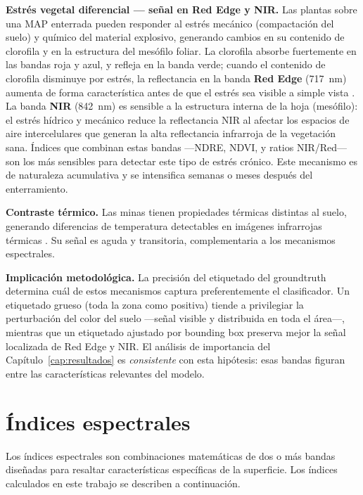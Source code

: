 \textbf{Estrés vegetal diferencial — señal en Red Edge y NIR.}
Las plantas sobre una \ac{MAP} enterrada pueden responder al estrés mecánico
(compactación del suelo) y químico del material explosivo, generando cambios
en su contenido de clorofila y en la estructura del mesófilo foliar. La
clorofila absorbe fuertemente en las bandas roja y azul, y refleja en la
banda verde; cuando el contenido de clorofila disminuye por estrés, la
reflectancia en la banda \textbf{Red Edge} (\SI{717}{nm}) aumenta de forma
característica antes de que el estrés sea visible a simple vista
\cite{qiu2023}. La banda \textbf{\ac{NIR}} (\SI{842}{nm}) es sensible a la
estructura interna de la hoja (mesófilo): el estrés hídrico y mecánico
reduce la reflectancia \ac{NIR} al afectar los espacios de aire intercelulares
que generan la alta reflectancia infrarroja de la vegetación sana. Índices
que combinan estas bandas —\ac{NDRE}, \ac{NDVI}, y ratios NIR/Red— son
los más sensibles para detectar este tipo de estrés crónico. Este mecanismo
es de naturaleza acumulativa y se intensifica semanas o meses después del
enterramiento.

\textbf{Contraste térmico.} Las minas tienen propiedades térmicas distintas
al suelo, generando diferencias de temperatura detectables en imágenes
infrarrojas térmicas \cite{forero2022,tenorio2024}. Su señal es aguda y
transitoria, complementaria a los mecanismos espectrales.

\textbf{Implicación metodológica.} La precisión del etiquetado del
groundtruth determina cuál de estos mecanismos captura preferentemente el
clasificador. Un etiquetado grueso (toda la zona como positiva) tiende a privilegiar la
perturbación del color del suelo ---señal visible y distribuida en toda el área---,
mientras que un etiquetado ajustado por bounding box preserva mejor la señal
localizada de Red Edge y \ac{NIR}. El análisis de importancia del
Capítulo~\ref{cap:resultados} es \emph{consistente} con esta hipótesis: esas bandas
figuran entre las características relevantes del modelo.

\section{Índices espectrales}
\label{sec:indices_espectrales}

Los índices espectrales son combinaciones matemáticas de dos o más bandas
diseñadas para resaltar características específicas de la superficie.
Los índices calculados en este trabajo se describen a continuación.

